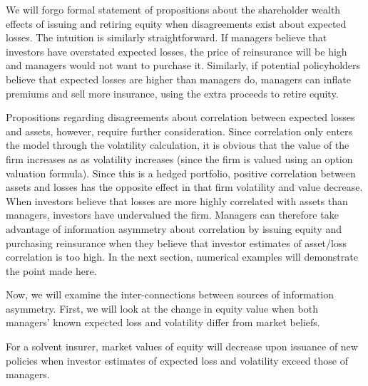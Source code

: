 
We will forgo formal statement of propositions about the shareholder wealth effects of issuing and retiring equity when disagreements exist about expected losses. The intuition is similarly straightforward. If managers believe that investors have overstated expected losses, the price of reinsurance will be high and managers would not want to purchase it. Similarly, if potential policyholders believe that expected losses are higher than managers do, managers can inflate premiums and sell more insurance, using the extra proceeds to retire equity.

Propositions regarding disagreements about correlation between expected losses and assets, however, require further consideration. Since correlation only enters the model through the volatility calculation, it is obvious that the value of the firm increases as as volatility increases (since the firm is valued using an option valuation formula). Since this is a hedged portfolio, positive correlation between assets and losses has the opposite effect in that firm volatility and value decrease. When investors believe that losses are more highly correlated with assets than managers, investors have undervalued the firm. Managers can therefore take advantage of information asymmetry about correlation by issuing equity and purchasing reinsurance when they believe that investor estimates of asset/loss correlation is too high. In the next section, numerical examples will demonstrate the point made here.

Now, we will examine the inter-connections between sources of information asymmetry. First, we will look at the change in equity value when both managers' known expected loss and volatility differ from market beliefs.

\begin{proposition}
For a solvent insurer, market values of equity will decrease upon issuance of new policies when investor estimates of expected loss and volatility exceed those of managers.
\end{proposition}

